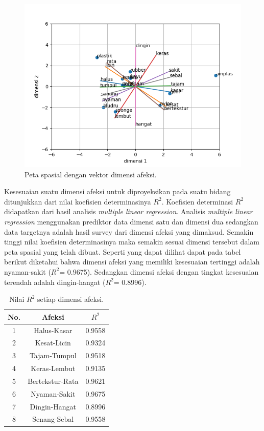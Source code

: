 \documentclass{Jurnal_kolo}
\begin{document}
\begin{multicols}{2}
	\begin{figure}[H]
		\centering
		\includegraphics[scale=0.5]{gambar/mds1.png}
		\caption{Peta spasial dengan vektor dimensi afeksi.}
		\label{mds-1}
	\end{figure} 
	\indent Kesesuaian suatu dimensi afeksi untuk diproyeksikan pada suatu bidang ditunjukkan dari nilai koefisien determinasinya $R^2$. Koefisien determinasi $R^2$ didapatkan dari hasil analisis \emph{multiple linear regression}. Analisis \emph{multiple linear regression} menggunakan prediktor data dimensi satu dan dimensi dua sedangkan data targetnya adalah hasil survey dari dimensi afeksi yang dimaksud. Semakin tinggi nilai koefisien determinasinya maka semakin sesuai dimensi tersebut dalam peta spasial yang telah dibuat\cite{Holliins1993}. Seperti yang dapat dilihat dapat pada tabel berikut diketahui bahwa dimensi afeksi yang memiliki kesesuaian tertinggi adalah nyaman-sakit ($R^2$= 0.9675). Sedangkan dimensi afeksi dengan tingkat kesesuaian terendah adalah dingin-hangat ($R^2$= 0.8996).\\
	
		\begin{table}[H]
		\centering
		\caption{Nilai $R^2$ setiap dimensi afeksi.}
		\label{r21}
		\begin{tabular}{|c|c|c|}
			\hline
			No. & Afeksi & $R^2$\\
			\hline
			1 & Halus-Kasar & 0.9558\\
			\hline
			2 & Kesat-Licin & 0.9324\\
			\hline
			3 & Tajam-Tumpul & 0.9518\\
			\hline
			4 & Keras-Lembut & 0.9135\\
			\hline
			5 & Bertekstur-Rata&0.9621\\
			\hline
			6 & Nyaman-Sakit & 0.9675\\
			\hline
			7 & Dingin-Hangat & 0.8996\\
			\hline
			8 & Senang-Sebal& 0.9558\\
			\hline
		\end{tabular}
	\end{table}
	

\end{multicols}
\end{document}
